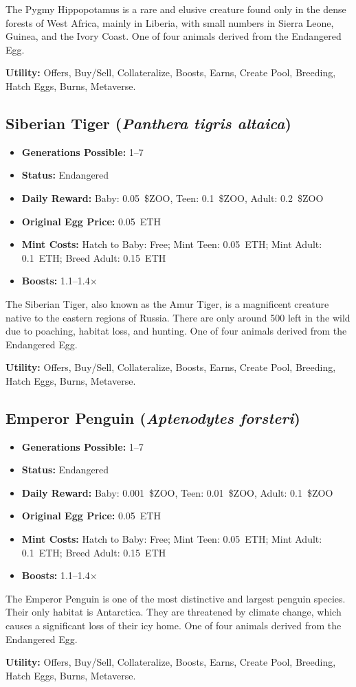 The Pygmy Hippopotamus is a rare and elusive creature found only in the dense forests of West Africa, mainly in Liberia, with small numbers in Sierra Leone, Guinea, and the Ivory Coast. One of four animals derived from the Endangered Egg.

\textbf{Utility:} Offers, Buy/Sell, Collateralize, Boosts, Earns, Create Pool, Breeding, Hatch Eggs, Burns, Metaverse.

\subsection{Siberian Tiger (\textit{Panthera tigris altaica})}

\begin{itemize}[nosep]
\item \textbf{Generations Possible:} 1--7
\item \textbf{Status:} Endangered
\item \textbf{Daily Reward:} Baby: 0.05~\$ZOO, Teen: 0.1~\$ZOO, Adult: 0.2~\$ZOO
\item \textbf{Original Egg Price:} 0.05~ETH
\item \textbf{Mint Costs:} Hatch to Baby: Free; Mint Teen: 0.05~ETH; Mint Adult: 0.1~ETH; Breed Adult: 0.15~ETH
\item \textbf{Boosts:} 1.1--1.4$\times$
\end{itemize}

The Siberian Tiger, also known as the Amur Tiger, is a magnificent creature native to the eastern regions of Russia. There are only around 500 left in the wild due to poaching, habitat loss, and hunting. One of four animals derived from the Endangered Egg.

\textbf{Utility:} Offers, Buy/Sell, Collateralize, Boosts, Earns, Create Pool, Breeding, Hatch Eggs, Burns, Metaverse.

\subsection{Emperor Penguin (\textit{Aptenodytes forsteri})}

\begin{itemize}[nosep]
\item \textbf{Generations Possible:} 1--7
\item \textbf{Status:} Endangered
\item \textbf{Daily Reward:} Baby: 0.001~\$ZOO, Teen: 0.01~\$ZOO, Adult: 0.1~\$ZOO
\item \textbf{Original Egg Price:} 0.05~ETH
\item \textbf{Mint Costs:} Hatch to Baby: Free; Mint Teen: 0.05~ETH; Mint Adult: 0.1~ETH; Breed Adult: 0.15~ETH
\item \textbf{Boosts:} 1.1--1.4$\times$
\end{itemize}

The Emperor Penguin is one of the most distinctive and largest penguin species. Their only habitat is Antarctica. They are threatened by climate change, which causes a significant loss of their icy home. One of four animals derived from the Endangered Egg.

\textbf{Utility:} Offers, Buy/Sell, Collateralize, Boosts, Earns, Create Pool, Breeding, Hatch Eggs, Burns, Metaverse.

